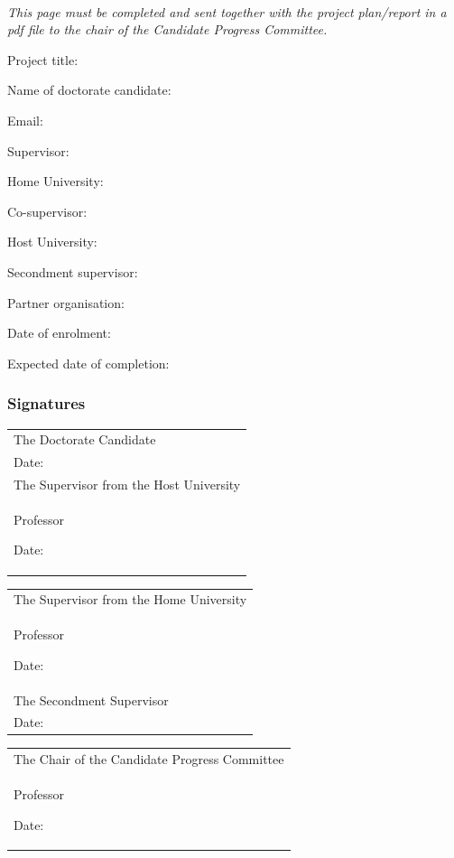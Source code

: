 \documentclass[12pt]{article}
\newcommand{\dottedline}{%
   {\rule{0pt}{5mm}\dotfill\newline}}
\begin{document}

\pagebreak

\noindent{}\\[5mm]

\emph{This page must be completed and sent together with the project
plan/report in a pdf file to the chair of the Candidate Progress Committee.}

\vspace*{3mm}

\noindent
Project title: \dottedline
Name of doctorate candidate: \dottedline
Email: \dottedline
Supervisor: \dottedline
Home University: \dottedline
Co-supervisor: \dottedline
Host University: \dottedline
Secondment supervisor: \dottedline
Partner organisation: \dottedline
Date of enrolment: \dottedline
Expected date of completion: \dottedline

\vspace*{3mm}
\subsubsection*{Signatures}
\vspace*{3mm}

\begin{tabular}{p{}}
The Doctorate Candidate\\
\dottedline
\vspace{2cm}%
Date: \\

The Supervisor from the Host University\\
Professor \dottedline
\vspace{2cm}%
Date: \\

\end{tabular}
%
\begin{tabular}{p{}}
The Supervisor from the Home University\\
Professor \dottedline
\vspace{2cm}%
Date: \\

The Secondment Supervisor \\
\dottedline
\vspace{2cm}%
Date: \\

\end{tabular}


\begin{center}
\begin{tabular}{p{}}
The Chair of the Candidate Progress Committee\\
Professor \dottedline
\vspace{2cm}%
Date: \\

\end{tabular}
\end{center}
\end{document}
